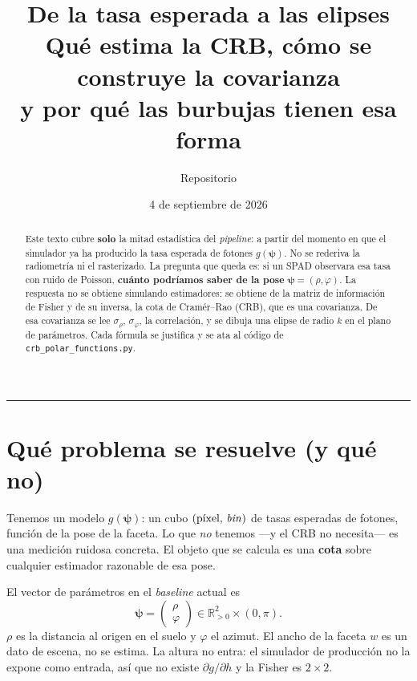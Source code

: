 \documentclass[11pt,a4paper]{article}
\title{\textbf{De la tasa esperada a las elipses}\\[2mm]
\large Qu\'e estima la CRB, c\'omo se construye la covarianza\\
y por qu\'e las burbujas tienen esa forma}
\author{Repositorio \code{crb}}
\date{4 de septiembre de 2026}
\newcommand{\vect}[1]{\boldsymbol{#1}}
\newcommand{\code}[1]{\texttt{#1}}
\theoremstyle{definition}
\theoremstyle{plain}
\begin{document}
\maketitle

\begin{abstract}
Este texto cubre \textbf{solo} la mitad estad\'istica del \emph{pipeline}: a
partir del momento en que el simulador ya ha producido la tasa esperada de
fotones $g(\vect\psi)$. No se rederiva la radiometr\'ia ni el rasterizado.
La pregunta que queda es: si un SPAD observara esa tasa con ruido de Poisson,
\textbf{cuánto podríamos saber de la pose} $\vect\psi=(\rho,\varphi)$.
La respuesta no se obtiene simulando estimadores: se obtiene de la matriz de
informaci\'on de Fisher y de su inversa, la cota de Cram\'er--Rao (CRB), que
es una covarianza. De esa covarianza se lee $\sigma_\rho$, $\sigma_\varphi$,
la correlaci\'on, y se dibuja una elipse de radio $k$ en el plano de
par\'ametros. Cada f\'ormula se justifica y se ata al c\'odigo de
\code{crb\_polar\_functions.py}.
\end{abstract}

\tableofcontents
\vspace{0.6em}
\hrule
\vspace{0.8em}

\section{Qu\'e problema se resuelve (y qu\'e no)}
\label{sec:problema}

Tenemos un modelo $g(\vect\psi)$: un cubo
$(\text{p\'ixel},\,\text{\emph{bin}})$ de tasas esperadas de fotones, funci\'on
de la pose de la faceta. Lo que \emph{no} tenemos ---y el CRB no necesita---
es una medici\'on ruidosa concreta. El objeto que se calcula es una
\textbf{cota} sobre cualquier estimador razonable de esa pose.

El vector de par\'ametros en el \emph{baseline} actual es
%
\begin{equation}
\label{eq:psi}
\vect\psi = \begin{pmatrix}\rho\\ \varphi\end{pmatrix}
\in \mathbb R^{2}_{>0}\times(0,\pi).
\end{equation}
%
$\rho$ es la distancia al origen en el suelo y $\varphi$ el azimut. El ancho
de la faceta $w$ es un dato de escena, no se estima. La altura no entra:
el simulador de producci\'on no la expone como entrada, as\'i que no existe
$\partial g/\partial h$ y la Fisher es $2\times 2$.
\end{document}
